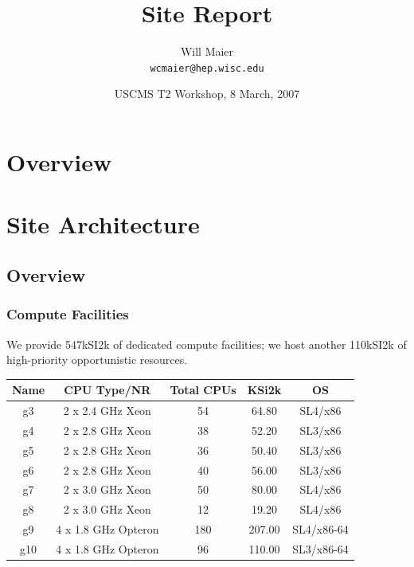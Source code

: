 \documentclass{beamer}
\title{Site Report}
\author[Will Maier]{Will Maier \\ \texttt{wcmaier@hep.wisc.edu}}
\institute[Wisconsin]{University of Wisconsin - High Energy Physics}
\date[8 March, 2007]{USCMS T2 Workshop, 8 March, 2007}
\begin{document}

\begin{frame}
    \titlepage
\end{frame}

\section{Overview}
\begin{frame}
    \tableofcontents
\end{frame}

\section{Site Architecture}
\subsection{Overview}
\begin{frame}
\frametitle{Compute Facilities}
We provide 547kSI2k of dedicated compute facilities; we host another 110kSI2k 
of high-priority opportunistic resources.

\vspace{.4cm}

\begin{center}
\begin{tabular}[c]{|c|c|c|c|c|}
\hline
{\bf Name}   & {\bf CPU Type/NR} & {\bf Total CPUs}  & {\bf KSi2k}   & {\bf OS} \\
\hline
g3  & 2 x 2.4 GHz Xeon      & 54    & 64.80     & SL4/x86 \\
g4  & 2 x 2.8 GHz Xeon      & 38    & 52.20     & SL3/x86 \\
g5  & 2 x 2.8 GHz Xeon      & 36    & 50.40     & SL3/x86 \\
g6  & 2 x 2.8 GHz Xeon      & 40    & 56.00     & SL3/x86 \\
g7  & 2 x 3.0 GHz Xeon      & 50    & 80.00     & SL4/x86 \\
g8  & 2 x 3.0 GHz Xeon      & 12    & 19.20     & SL4/x86 \\
g9  & 4 x 1.8 GHz Opteron   & 180   & 207.00    & SL4/x86-64 \\
g10 & 4 x 1.8 GHz Opteron   & 96    & 110.00    & SL3/x86-64\footnotemark[1] \\
\hline
\end{tabular}
\end{center}
\end{frame}
\end{document}
